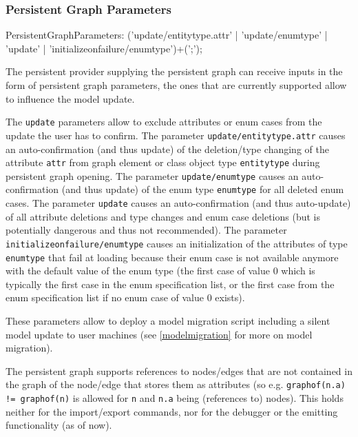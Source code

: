 \subsubsection*{Persistent Graph Parameters}
\label{persistentgraphparameters}

\begin{rail}
  PersistentGraphParameters: ('update/entitytype.attr' | 'update/enumtype' | 'update' | 'initializeonfailure/enumtype')+(';');
\end{rail}

The persistent provider supplying the persistent graph can receive inputs in the form of persistent graph parameters, the ones that are currently supported allow to influence the model update.

The \texttt{update} parameters allow to exclude attributes or enum cases from the update the user has to confirm.
The parameter \texttt{update/entitytype.attr} causes an auto-confirmation (and thus update) of the deletion/type changing of the attribute \texttt{attr} from graph element or class object type \texttt{entitytype} during persistent graph opening.
The parameter \texttt{update/enumtype} causes an auto-confirmation (and thus update) of the enum type \texttt{enumtype} for all deleted enum cases.
The parameter \texttt{update} causes an auto-confirmation (and thus auto-update) of all attribute deletions and type changes and enum case deletions (but is potentially dangerous and thus not recommended).
The parameter \texttt{initializeonfailure/enumtype} causes an initialization of the attributes of type \texttt{enumtype} that fail at loading because their enum case is not available anymore with the default value of the enum type (the first case of value 0 which is typically the first case in the enum specification list, or the first case from the enum specification list if no enum case of value 0 exists).

These parameters allow to deploy a model migration script including a silent model update to user machines (see \ref{modelmigration} for more on model migration).

\begin{warning}
The persistent graph supports references to nodes/edges that are not contained in the graph of the node/edge that stores them as attributes (so e.g. \texttt{graphof(n.a) != graphof(n)} is allowed for \texttt{n} and \texttt{n.a} being (references to) nodes).
This holds neither for the import/export commands, nor for the debugger or the emitting functionality (as of now).
\end{warning}


